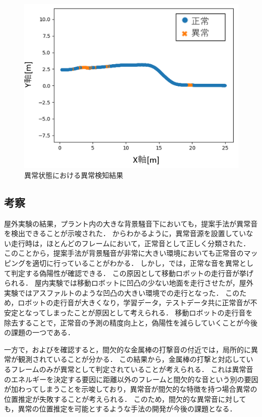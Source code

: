 \documentclass[../main]{subfiles}
\begin{document}
\begin{figure}[t]
  \centering
  \includegraphics[keepaspectratio, width=0.7\linewidth]{chap4/field_abnormal.png}
  \caption{異常状態における異常検知結果}
  \label{fig:field_abnormal}
\end{figure}


\subsection{考察}

屋外実験の結果，プラント内の大きな背景騒音下においても，提案手法が異常音を検出できることが示唆された．
からわかるように，異常音源を設置していない走行時は，ほとんどのフレームにおいて，正常音として正しく分類された．
このことから，提案手法が背景騒音が非常に大きい環境においても正常音のマッピングを適切に行っていることがわかる．
しかし，では，正常な音を異常として判定する偽陽性が確認できる．
この原因として移動ロボットの走行音が挙げられる．
屋内実験では移動ロボットに凹凸の少ない地面を走行させたが，屋外実験ではアスファルトのような凹凸の大きい環境での走行となった．
このため，ロボットの走行音が大きくなり，学習データ，テストデータ共に正常音が不安定となってしまったことが原因として考えられる．
移動ロボットの走行音を除去することで，正常音の予測の精度向上と，偽陽性を減らしていくことが今後の課題の一つである．

一方で，およびを確認すると，間欠的な金属棒の打撃音の付近では，局所的に異常が観測されていることが分かる．
この結果から，金属棒の打撃と対応しているフレームのみが異常として判定されていることが考えられる．
これは異常音のエネルギーを決定する要因に距離以外のフレームと間欠的な音という別の要因が加わってしまうことを示唆しており，異常音が間欠的な特徴を持つ場合異常の位置推定が失敗することが考えられる．
このため，間欠的な異常音に対しても，異常の位置推定を可能とするような手法の開発が今後の課題となる．
\end{document}
